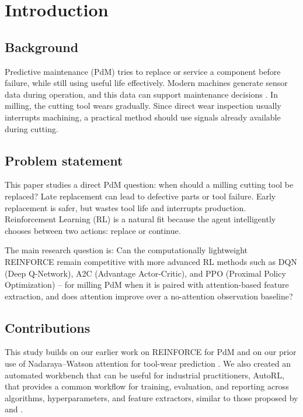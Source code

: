 \documentclass[sn-basic]{sn-jnl}%
\begin{document}

\maketitle

\section{Introduction}
\subsection{Background}
Predictive maintenance (PdM) tries to replace or service a component before failure, while still using useful life effectively. Modern machines generate sensor data during operation, and this data can support maintenance decisions \cite{Zonta2020, Compare2020}. In milling, the cutting tool wears gradually. Since direct wear inspection usually interrupts machining, a practical method should use signals already available during cutting.

\subsection{Problem statement}
This paper studies a direct PdM question: when should a milling cutting tool be replaced? Late replacement can lead to defective parts or tool failure. Early replacement is safer, but wastes tool life and interrupts production. Reinforcement Learning (RL) is a natural fit because the agent intelligently chooses between two actions: replace or continue.

The main research question is: Can the computationally lightweight \textsc{REINFORCE} remain competitive with more advanced RL methods such as \textsc{DQN} (Deep Q-Network), \textsc{A2C} (Advantage Actor-Critic), and \textsc{PPO} (Proximal Policy Optimization) -- for milling PdM when it is paired with attention-based feature extraction, and does attention improve over a no-attention observation baseline?

\subsection{Contributions}

This study builds on our earlier work on \textsc{REINFORCE} for PdM \cite{Siraskar2025} and on our prior use of Nadaraya--Watson attention for tool-wear prediction \cite{Siraskar2024}. We also created an automated workbench that can be useful for industrial practitioners, AutoRL, that provides a common workflow for training, evaluation, and reporting across algorithms, hyperparameters, and feature extractors, similar to those proposed by \cite{Faust2019} and \cite{Mussi2022}.
\end{document}
